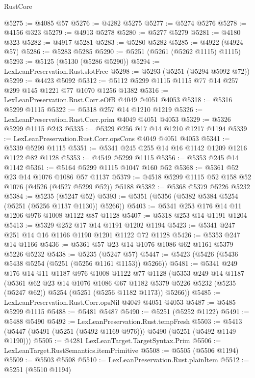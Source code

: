 \begin{lexlean}{RustCore}
\begin{coremodule}
@5275 := @4085 @57
@5276 := @4282 @5275
@5277 := @5274 @5276
@5278 := @4156 @323
@5279 := @4913 @5278
@5280 := @5277 @5279
@5281 := @4180 @323
@5282 := @4917 @5281
@5283 := @5280 @5282
@5285 := @4922 (@4924 @57)
@5286 := @5283 @5285
@5290 := @5251 (@5261 (@5262 @1115) @1115)
@5293 := @5125 (@5130 (@5286 @5290))
@5294 := LexLeanPreservation.Rust.slotFree
@5298 := @5293 (@5251 (@5294 @5092 @72))
@5299 := @4423 @5092
@5312 := @5112 @5299 @1115 @1115 @77 @14 @257 @299 @145 @1221 @77 @1070 @1256 @1382
@5316 := LexLeanPreservation.Rust.Corr.eOfB @4049 @4051 @4053
@5318 := @5316 @5299 @1115
@5322 := @5318 @257 @14 @1210 @1219
@5326 := LexLeanPreservation.Rust.Corr.prim @4049 @4051 @4053
@5329 := @5326 @5299 @1115 @243
@5335 := @5329 @256 @17 @14 @1210 @1217 @1194
@5339 := LexLeanPreservation.Rust.Corr.opsCons @4049 @4051 @4053
@5341 := @5339 @5299 @1115
@5351 := @5341 @245 @255 @14 @16 @1142 @1209 @1216 @1122 @82 @1128
@5353 := @4549 @5299 @1115
@5356 := @5353 @245 @14 @1142
@5361 := @5164 @5299 @1115 @1047 @160 @52
@5368 := @5361 @52 @23 @14 @1076 @1086 @57 @1137
@5379 := @4518 @5299 @1115 @52 @158 @52 @1076 (@4526 (@4527 @5299 @52)) @5188
@5382 := @5368 @5379 @5226 @5232
@5384 := @5235 (@5247 @52)
@5393 := @5351 (@5356 (@5382 @5384 @5254 (@5251 (@5256 @1137 @1130)) @5266))
@5403 := @5341 @253 @176 @14 @11 @1206 @976 @1008 @1122 @87 @1128
@5407 := @5318 @253 @14 @1191 @1204
@5413 := @5329 @252 @17 @14 @1191 @1202 @1194
@5423 := @5341 @247 @251 @14 @16 @1166 @1190 @1201 @1122 @72 @1128
@5426 := @5353 @247 @14 @1166
@5436 := @5361 @57 @23 @14 @1076 @1086 @62 @1161 @5379 @5226 @5232
@5438 := @5235 (@5247 @57)
@5447 := @5423 (@5426 (@5436 @5438 @5254 (@5251 (@5256 @1161 @1153)) @5266))
@5481 := @5341
    @249
    @176
    @14
    @11
    @1187
    @976
    @1008
    @1122
    @77
    @1128
    (@5353
      @249
      @14
      @1187
      (@5361
        @62
        @23
        @14
        @1076
        @1086
        @67
        @1182
        @5379
        @5226
        @5232
        (@5235 (@5247 @62))
        @5254
        (@5251 (@5256 @1182 @1173))
        @5266))
@5485 := LexLeanPreservation.Rust.Corr.opsNil @4049 @4051 @4053
@5487 := @5485 @5299 @1115
@5488 := @5481 @5487
@5490 := @5251 (@5252 @1122)
@5491 := @5488 @5490
@5492 := LexLeanPreservation.Rust.tempFresh
@5503 := @5413 (@5447 (@5491 (@5251 (@5492 @1169 @976))) @5490 (@5251 (@5492 @1149 @1190)))
@5505 := @4281 LexLeanTarget.TargetSyntax.Prim
@5506 := LexLeanTarget.RustSemantics.itemPrimitive
@5508 := @5505 (@5506 @1194)
@5509 := @5503 @5508
@5510 := LexLeanPreservation.Rust.plainItem
@5512 := @5251 (@5510 @1194)

\end{coremodule}
\end{lexlean}
